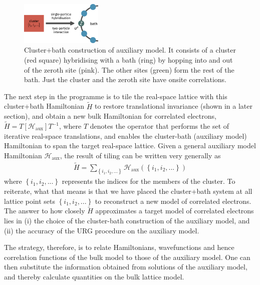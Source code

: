 \documentclass[reprint,hidelinks]{revtex4-2}
\begin{document}
\begin{figure}[!htb]
 	\centering
 	\includegraphics[width=0.35\textwidth]{gen_siam.pdf}
 	\caption{Cluster+bath construction of auxiliary model. It consists of a cluster (red square) hybridising with a bath (ring) by hopping into and out of the zeroth site (pink). The other sites (green) form the rest of the bath. Just the cluster and the zeroth site have onsite correlations.}
 \end{figure}
 The next step in the programme is to tile the real-space lattice with this cluster+bath Hamiltonian \(\tilde H\) to restore translational invariance (shown in a later section), and obtain a new bulk Hamiltonian for correlated electrons, $\tilde H = T\left[ \mathcal{H}_\text{aux} \right] T^{-1}$, where $T$ denotes the operator that performs the set of iterative real-space translations, and enables the cluster-bath (auxiliary model) Hamiltonian to span the target real-space lattice. Given a general auxiliary model Hamiltonian \(\mathcal{H}_\text{aux}\), the result of tiling can be written very generally as
 \begin{equation}\begin{aligned}
	 \tilde H = \sum_{\left\{i_1,i_2,...\right\}} \mathcal{H}_\text{aux}\left(\left\{i_1,i_2,...\right\}\right)
 \end{aligned}\end{equation}
where \(\left\{i_1,i_2,...\right\}\) represents the indices for the members of the cluster. To reiterate, what that means is that we have placed the cluster+bath system at all lattice point sets \(\left\{i_1,i_2,...\right\}\) to reconstruct a new model of correlated electrons. The answer to how closely $\tilde H$ approximates a target model of correlated electrons lies in (i) the choice of the cluster-bath construction of the auxiliary model, and (ii) the accuracy of the URG procedure on the auxiliary model.

The strategy, therefore, is to relate Hamiltonians, wavefunctions and hence correlation functions of the bulk model to those of the auxiliary model. One can then substitute the information obtained from solutions of the auxiliary model, and thereby calculate quantities on the bulk lattice model.
\end{document}
